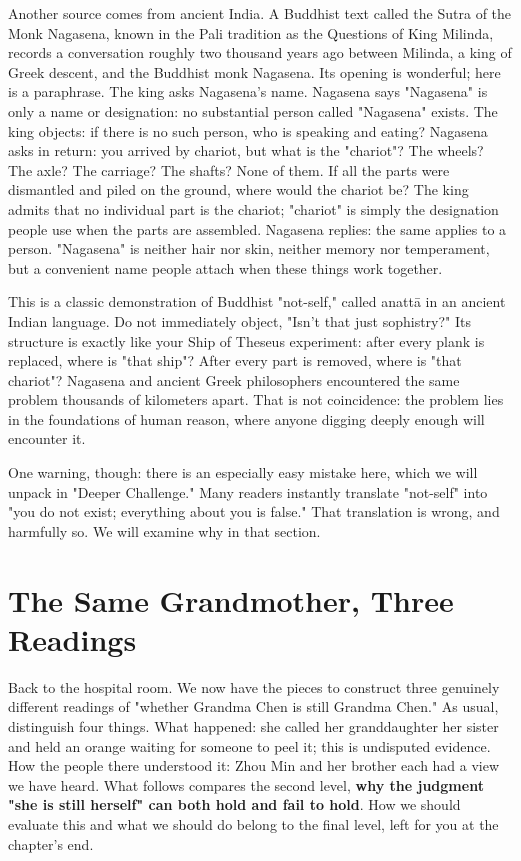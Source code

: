 Another source comes from ancient India. A Buddhist text called the Sutra of the Monk Nagasena, known in the Pali tradition as the Questions of King Milinda, records a conversation roughly two thousand years ago between Milinda, a king of Greek descent, and the Buddhist monk Nagasena. Its opening is wonderful; here is a paraphrase. The king asks Nagasena's name. Nagasena says "Nagasena" is only a name or designation: no substantial person called "Nagasena" exists. The king objects: if there is no such person, who is speaking and eating? Nagasena asks in return: you arrived by chariot, but what is the "chariot"? The wheels? The axle? The carriage? The shafts? None of them. If all the parts were dismantled and piled on the ground, where would the chariot be? The king admits that no individual part is the chariot; "chariot" is simply the designation people use when the parts are assembled. Nagasena replies: the same applies to a person. "Nagasena" is neither hair nor skin, neither memory nor temperament, but a convenient name people attach when these things work together.

This is a classic demonstration of Buddhist "not-self," called anattā in an ancient Indian language. Do not immediately object, "Isn't that just sophistry?" Its structure is exactly like your Ship of Theseus experiment: after every plank is replaced, where is "that ship"? After every part is removed, where is "that chariot"? Nagasena and ancient Greek philosophers encountered the same problem thousands of kilometers apart. That is not coincidence: the problem lies in the foundations of human reason, where anyone digging deeply enough will encounter it.

One warning, though: there is an especially easy mistake here, which we will unpack in "Deeper Challenge." Many readers instantly translate "not-self" into "you do not exist; everything about you is false." That translation is wrong, and harmfully so. We will examine why in that section.

\section[One Grandmother, Three Readings]{The Same Grandmother, Three Readings}
Back to the hospital room. We now have the pieces to construct three genuinely different readings of "whether Grandma Chen is still Grandma Chen." As usual, distinguish four things. What happened: she called her granddaughter her sister and held an orange waiting for someone to peel it; this is undisputed evidence. How the people there understood it: Zhou Min and her brother each had a view we have heard. What follows compares the second level, \textbf{why the judgment "she is still herself" can both hold and fail to hold}. How we should evaluate this and what we should do belong to the final level, left for you at the chapter's end.

